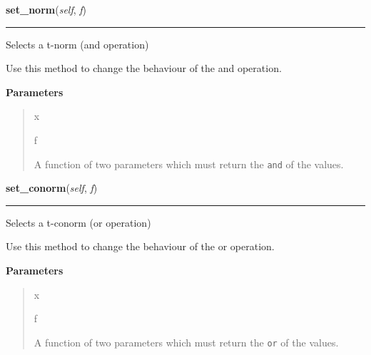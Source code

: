     \begin{boxedminipage}{\textwidth}

    \raggedright \textbf{set\_norm}(\textit{self}, \textit{f})

    \vspace{-1.5ex}

    \rule{\textwidth}{0.5\fboxrule}

Selects a t-norm (and operation)

Use this method to change the behaviour of the and operation.
    \vspace{1ex}

      \textbf{Parameters}
      \begin{quote}
        \begin{Ventry}{x}

          \item[f]


A function of two parameters which must return the \texttt{and} of the
values.
        \end{Ventry}

      \end{quote}

    \vspace{1ex}

    \end{boxedminipage}

    \label{peach:fuzzy:fuzzy:FuzzySet:set_conorm}

    \vspace{0.5ex}

    \begin{boxedminipage}{\textwidth}

    \raggedright \textbf{set\_conorm}(\textit{self}, \textit{f})

    \vspace{-1.5ex}

    \rule{\textwidth}{0.5\fboxrule}

Selects a t-conorm (or operation)

Use this method to change the behaviour of the or operation.
    \vspace{1ex}

      \textbf{Parameters}
      \begin{quote}
        \begin{Ventry}{x}

          \item[f]


A function of two parameters which must return the \texttt{or} of the
values.
        \end{Ventry}

      \end{quote}

    \vspace{1ex}

    \end{boxedminipage}

